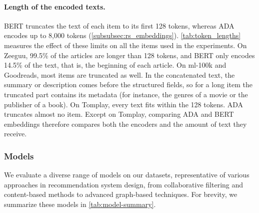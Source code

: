\begin{mmblock}
\paragraph{Length of the encoded texts.} BERT truncates the text of each item to its first 128 tokens, whereas ADA encodes up to 8,000 tokens (\autoref{subsubsec:rs_embeddings}). \autoref{tab:token_lengths} measures the effect of these limits on all the items used in the experiments. On Zeeguu, 99.5\% of the articles are longer than 128 tokens, and BERT only encodes 14.5\% of the text, that is, the beginning of each article. On ml-100k and Goodreads, most items are truncated as well. In the concatenated text, the summary or description comes before the structured fields, so for a long item the truncated part contains its metadata (for instance, the genres of a movie or the publisher of a book). On Tomplay, every text fits within the 128 tokens. ADA truncates almost no item. Except on Tomplay, comparing ADA and BERT embeddings therefore compares both the encoders and the amount of text they receive.
\end{mmblock}

\begin{table}[ht]
\centering
\begin{mmblock}
\caption{Length of the item texts in tokens of each model (all the items used in the experiments, see \autoref{tab:datasets}) and effect of the truncation. Items truncated: share of the items longer than the limit. Text encoded: share of all the tokens of the dataset that BERT receives.}
\label{tab:token_lengths}
\setlength{\tabcolsep}{4pt} %

\end{mmblock}
\end{table}

\subsubsection{Models}
\label{subsec:models}

We evaluate a diverse range of models on our datasets, representative of various approaches in recommendation system design, from collaborative filtering and content-based methods to advanced graph-based techniques. For brevity, we summarize these models in \autoref{tab:model-summary}.



